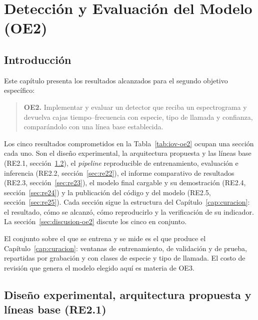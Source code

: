 \chapter{Detección y Evaluación del Modelo (OE2)}
\label{cap:deteccion}

\newcommand{\figDET}{capitulos/05_oe2_detector/figures}

\section{Introducción}

Este capítulo presenta los resultados alcanzados para el segundo objetivo
específico:

\begin{quote}
    \textbf{OE2.} Implementar y evaluar un detector que reciba un espectrograma y
    devuelva cajas tiempo--frecuencia con especie, tipo de llamada y confianza,
    comparándolo con una línea base establecida.
\end{quote}

Los cinco resultados comprometidos en la Tabla~\ref{tab:iov-oe2} ocupan una
sección cada uno. Son el diseño experimental, la arquitectura propuesta y las
líneas base (RE2.1, sección~\ref{sec:re21}), el \textit{pipeline} reproducible de
entrenamiento, evaluación e inferencia (RE2.2, sección~\ref{sec:re22}), el
informe comparativo de resultados (RE2.3, sección~\ref{sec:re23}), el modelo
final cargable y su demostración (RE2.4, sección~\ref{sec:re24}) y la
publicación del código y del modelo (RE2.5, sección~\ref{sec:re25}). Cada
sección sigue la estructura del Capítulo~\ref{cap:curacion}: el resultado, cómo
se alcanzó, cómo reproducirlo y la verificación de su indicador. La
sección~\ref{sec:discusion-oe2} discute los cinco en conjunto.

El conjunto sobre el que se entrena y se mide es el que produce el
Capítulo~\ref{cap:curacion}: \nWindowsTrain{} ventanas de entrenamiento,
\nWindowsVal{} de validación y \nWindowsTest{} de prueba, repartidas por
grabación y con \nClasses{} clases de especie y tipo de llamada. El costo de
revisión que genera el modelo elegido aquí es materia de OE3.

\section{Diseño experimental, arquitectura propuesta y líneas base (RE2.1)}
\label{sec:re21}
\label{sec:arquitectura}

